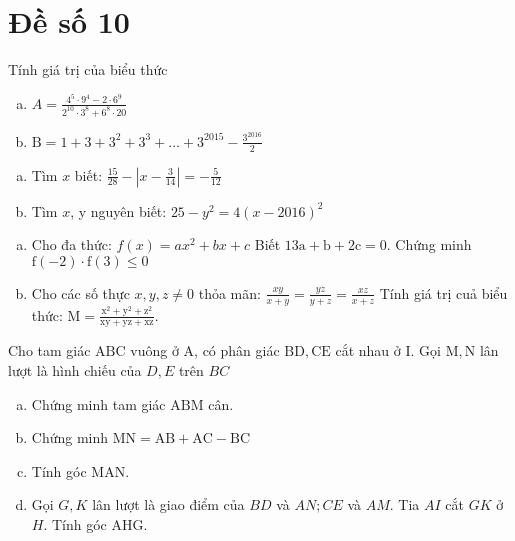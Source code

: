 \onehalfspacing
\section{Đề số 10}
\graphicspath{{./img/}}
\begin{bt} 
	Tính giá trị của biểu thức
	\begin{enumerate}[a.]
		\item $A=\frac{4^5 \cdot 9^4-2 \cdot 6^9}{2^{10} \cdot 3^8+6^8 \cdot 20}$
		\item $\mathrm{B}=1+3+3^2+3^3+\ldots+3^{2015}-\frac{3^{2016}}{2}$
	\end{enumerate}
	\loigiai{} 
\end{bt}

\begin{bt}
	\hfill
	\begin{enumerate}[a.]
		\item Tìm $x$ biết: $\frac{15}{28}-\left|x-\frac{3}{14}\right|=-\frac{5}{12}$
		\item Tìm $x$, y nguyên biết: $25-y^2=4(x-2016)^2$
	\end{enumerate}
	\loigiai{} 
\end{bt}

\begin{bt}
	\hfill
	\begin{enumerate}[a.]
		\item Cho đa thức: $f(x)=a x^2+b x+c$
		Biết $13 \mathrm{a}+\mathrm{b}+2 \mathrm{c}=0$. Chứng minh $\mathrm{f}(-2) \cdot \mathrm{f}(3) \leq 0$
		\item Cho các số thực $x, y, z \neq 0$ thỏa mãn: $\frac{x y}{x+y}=\frac{y z}{y+z}=\frac{x z}{x+z}$
		Tính giá trị cuả biểu thức: $\mathrm{M}=\frac{\mathrm{x}^2+\mathrm{y}^2+\mathrm{z}^2}{\mathrm{xy}+\mathrm{yz}+\mathrm{xz}}$.
	\end{enumerate}
	\loigiai{} 
\end{bt}

\begin{bt}
	Cho tam giác $\mathrm{ABC}$ vuông ở $\mathrm{A}$, có phân giác $\mathrm{BD}, \mathrm{CE}$ cắt nhau ở $\mathrm{I}$. Gọi $\mathrm{M}, \mathrm{N}$ lân lượt là hình chiếu của $D, E$ trên $B C$
	\begin{enumerate}[a.]
		\item Chứng minh tam giác $\mathrm{ABM}$ cân.
		\item Chứng minh $\mathrm{MN}=\mathrm{AB}+\mathrm{AC}-\mathrm{BC}$
		\item Tính góc MAN.
		\item Gọi $G, K$ lân lượt là giao điểm của $B D$ và $A N ; C E$ và $A M$. Tia $A I$ cắt $G K$ ở $H$. Tính góc AHG.
	\end{enumerate}
	\loigiai{}
\end{bt}
